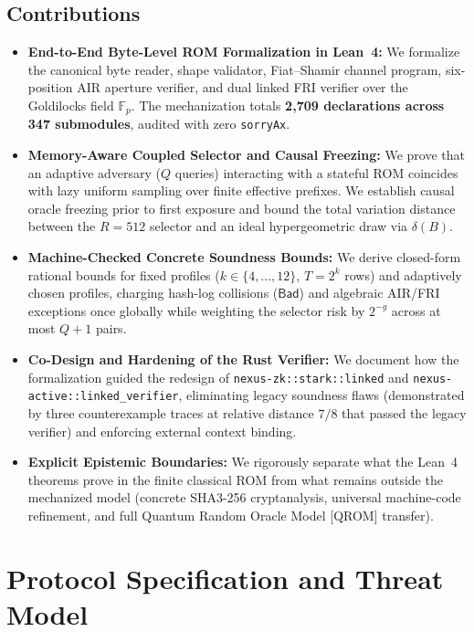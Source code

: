 \documentclass[conference]{IEEEtran}
\theoremstyle{definition}
\begin{document}
\subsection{Contributions}
\begin{itemize}
    \setlength{\itemsep}{3pt}
    \item \textbf{End-to-End Byte-Level ROM Formalization in Lean~4:} We formalize the canonical byte reader, shape validator, Fiat--Shamir channel program, six-position AIR aperture verifier, and dual linked FRI verifier over the Goldilocks field $\mathbb{F}_p$. The mechanization totals \textbf{2,709 declarations across 347 submodules}, audited with zero \texttt{sorryAx}.
    \item \textbf{Memory-Aware Coupled Selector and Causal Freezing:} We prove that an adaptive adversary ($Q$ queries) interacting with a stateful ROM coincides with lazy uniform sampling over finite effective prefixes. We establish causal oracle freezing prior to first exposure and bound the total variation distance between the $R = 512$ selector and an ideal hypergeometric draw via $\delta(B)$.
    \item \textbf{Machine-Checked Concrete Soundness Bounds:} We derive closed-form rational bounds for fixed profiles ($k \in \{4,\dots,12\}$, $T = 2^k$ rows) and adaptively chosen profiles, charging hash-log collisions ($\mathsf{Bad}$) and algebraic AIR/FRI exceptions once globally while weighting the selector risk by $2^{-g}$ across at most $Q + 1$ pairs.
    \item \textbf{Co-Design and Hardening of the Rust Verifier:} We document how the formalization guided the redesign of \texttt{nexus-zk::stark::linked} and \texttt{nexus-active::linked\_verifier}, eliminating legacy soundness flaws (demonstrated by three counterexample traces at relative distance $7/8$ that passed the legacy verifier) and enforcing external context binding.
    \item \textbf{Explicit Epistemic Boundaries:} We rigorously separate what the Lean~4 theorems prove in the finite classical ROM from what remains outside the mechanized model (concrete SHA3-256 cryptanalysis, universal machine-code refinement, and full Quantum Random Oracle Model [QROM] transfer).
\end{itemize}

\section{Protocol Specification and Threat Model}
\label{sec:protocol}
\end{document}
